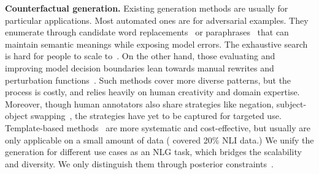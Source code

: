 \noindent\textbf{Counterfactual generation.}
Existing generation methods are usually for particular applications.
Most automated ones are for adversarial examples. 
They enumerate through candidate word replacements~\cite{alzantot2018generating, garg2020bae, alzantot2018generating, andreas2019good} or paraphrases~\cite{iyyer2018adversarial, malandrakis-etal-2019-controlled} that can maintain semantic meanings while exposing model errors.
The exhaustive search is hard for people to scale to~\cite{ribeiro2018sear}.
On the other hand, those evaluating and improving model decision boundaries lean towards manual rewrites and perturbation functions~\cite{checklist:acl20}.
Such methods cover more diverse patterns, but the process is costly, and relies heavily on human creativity and domain expertise.
Moreover, though human annotators also share strategies like negation, subject-object swapping~\cite{kaushik2019learning, gardner2020contrast}, the strategies have yet to be captured for targeted use.
Template-based methods~\cite{mccoy2019right, nie2019analyzing} are more systematic and cost-effective, but usually are only applicable on a small amount of data (\eg \citet{li2020linguistically} covered 20\% NLI data.)
We unify the generation for different use cases as an NLG task, which bridges the scalability and diversity.
We only distinguish them through posterior constraints~\cite{morris2020textattack, alzantot-etal-2018-generating}.







